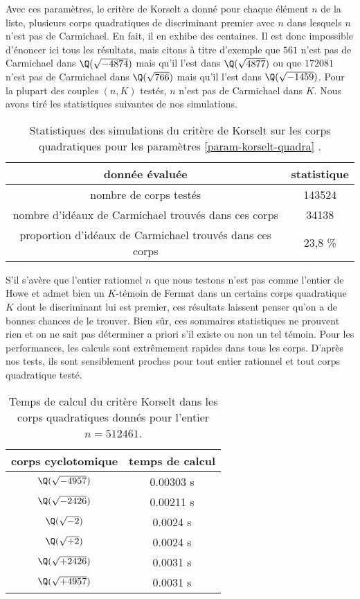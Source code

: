 Avec ces paramètres, le critère de Korselt a donné pour chaque élément $n$ de la liste, plusieurs corps quadratiques de discriminant premier avec $n$ dans lesquels $n$ n'est pas de Carmichael. En fait, il en exhibe des centaines. Il est donc impossible d'énoncer ici tous les résultats, mais citons à titre d'exemple que $561$ n'est pas de Carmichael dans $\Q(\sqrt{-4874})$ mais qu'il l'est dans $\Q(\sqrt{4877})$ ou que $172081$ n'est pas de Carmichael dans $\Q(\sqrt{766})$ mais qu'il l'est dans $\Q(\sqrt{-1459})$. Pour la plupart des couples $(n, K)$ testés, $n$ n'est pas de Carmichael dans $K$. Nous avons tiré les statistiques suivantes de nos simulations.

\begin{table}[H]
	\begin{center}
		\begin{tabular}{|c|c|}
			\hline
			donnée évaluée & statistique \\
			\hline
			\hline
			nombre de corps testés & 143524 \\\hline
			nombre d'idéaux de Carmichael trouvés dans ces corps & 34138 \\\hline
			proportion d'idéaux de Carmichael trouvés dans ces corps & 23,8 \% \\\hline
		\end{tabular}
		\caption{Statistiques des simulations du critère de Korselt sur les corps quadratiques pour les paramètres \ref{param-korselt-quadra} .}
	\end{center}
\end{table}

S'il s'avère que l'entier rationnel $n$ que nous testons n'est pas comme l'entier de Howe et admet bien un $K$-témoin de Fermat dans un certains corps quadratique $K$ dont le discriminant lui est premier, ces résultats laissent penser qu'on a de bonnes chances de le trouver. Bien sûr, ces sommaires statistiques ne prouvent rien et on ne sait pas déterminer a priori s'il existe ou non un tel témoin. Pour les performances, les calculs sont extrêmement rapides dans tous les corps. D'après nos tests, ils sont sensiblement proches pour tout entier rationnel et tout corps quadratique testé.

\begin{table}[H]
	\begin{center}
		\begin{tabular}{|c|c|}
			\hline
			corps cyclotomique & temps de calcul \\
			\hline
			\hline
			$\Q(\sqrt{-4957})$ & 0.00303 s \\\hline
			$\Q(\sqrt{-2426})$ & 0.00211 s \\\hline
			$\Q(\sqrt{-2})$ & 0.0024 s \\\hline
			$\Q(\sqrt{+2})$ & 0.0024 s \\\hline
			$\Q(\sqrt{+2426})$ & 0.0031 s \\\hline
			$\Q(\sqrt{+4957})$ & 0.0031 s \\\hline
		\end{tabular}
		\caption{Temps de calcul du critère Korselt dans les corps quadratiques donnés pour l'entier $n=512461$.}
	\end{center}
\end{table}
